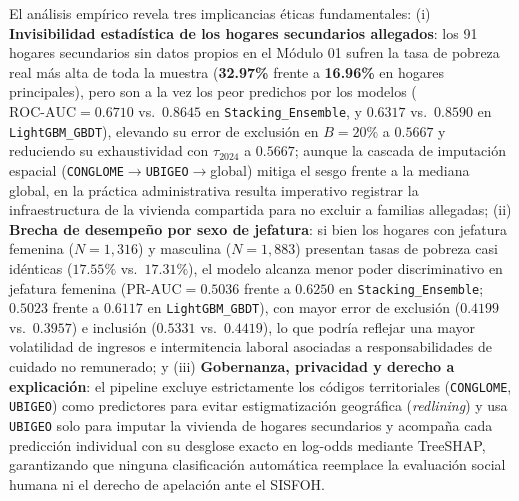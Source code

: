 El análisis empírico revela tres implicancias éticas fundamentales: (i) \textbf{Invisibilidad estadística de los hogares secundarios allegados}: los 91 hogares secundarios sin datos propios en el Módulo 01 sufren la tasa de pobreza real más alta de toda la muestra (\textbf{32.97\%} frente a \textbf{16.96\%} en hogares principales), pero son a la vez los peor predichos por los modelos ($\text{ROC-AUC}=0.6710$ vs.\ $0.8645$ en \texttt{Stacking\_Ensemble}, y $0.6317$ vs.\ $0.8590$ en \texttt{LightGBM\_GBDT}), elevando su error de exclusión en $B=20\%$ a $0.5667$ y reduciendo su exhaustividad con $\tau_{2024}$ a $0.5667$; aunque la cascada de imputación espacial (\texttt{CONGLOME}$\rightarrow$\texttt{UBIGEO}$\rightarrow$global) mitiga el sesgo frente a la mediana global, en la práctica administrativa resulta imperativo registrar la infraestructura de la vivienda compartida para no excluir a familias allegadas; (ii) \textbf{Brecha de desempeño por sexo de jefatura}: si bien los hogares con jefatura femenina ($N=1{,}316$) y masculina ($N=1{,}883$) presentan tasas de pobreza casi idénticas ($17.55\%$ vs.\ $17.31\%$), el modelo alcanza menor poder discriminativo en jefatura femenina ($\text{PR-AUC}=0.5036$ frente a $0.6250$ en \texttt{Stacking\_Ensemble}; $0.5023$ frente a $0.6117$ en \texttt{LightGBM\_GBDT}), con mayor error de exclusión ($0.4199$ vs.\ $0.3957$) e inclusión ($0.5331$ vs.\ $0.4419$), lo que podría reflejar una mayor volatilidad de ingresos e intermitencia laboral asociadas a responsabilidades de cuidado no remunerado; y (iii) \textbf{Gobernanza, privacidad y derecho a explicación}: el pipeline excluye estrictamente los códigos territoriales (\texttt{CONGLOME}, \texttt{UBIGEO}) como predictores para evitar estigmatización geográfica (\textit{redlining}) y usa \texttt{UBIGEO} solo para imputar la vivienda de hogares secundarios y acompaña cada predicción individual con su desglose exacto en log-odds mediante TreeSHAP, garantizando que ninguna clasificación automática reemplace la evaluación social humana ni el derecho de apelación ante el SISFOH.
